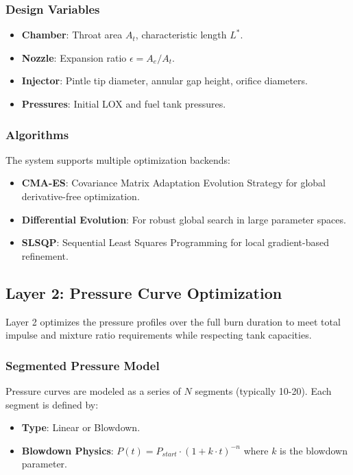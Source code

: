 \subsubsection{Design Variables}
\begin{itemize}
    \item \textbf{Chamber}: Throat area $A_t$, characteristic length $L^*$.
    \item \textbf{Nozzle}: Expansion ratio $\epsilon = A_e/A_t$.
    \item \textbf{Injector}: Pintle tip diameter, annular gap height, orifice diameters.
    \item \textbf{Pressures}: Initial LOX and fuel tank pressures.
\end{itemize}

\subsubsection{Algorithms}
The system supports multiple optimization backends:
\begin{itemize}
    \item \textbf{CMA-ES}: Covariance Matrix Adaptation Evolution Strategy for global derivative-free optimization.
    \item \textbf{Differential Evolution}: For robust global search in large parameter spaces.
    \item \textbf{SLSQP}: Sequential Least Squares Programming for local gradient-based refinement.
\end{itemize}

\subsection{Layer 2: Pressure Curve Optimization}
Layer 2 optimizes the pressure profiles over the full burn duration to meet total impulse and mixture ratio requirements while respecting tank capacities.

\subsubsection{Segmented Pressure Model}
Pressure curves are modeled as a series of $N$ segments (typically 10-20). Each segment is defined by:
\begin{itemize}
    \item \textbf{Type}: Linear or Blowdown.
    \item \textbf{Blowdown Physics}: $P(t) = P_{start} \cdot (1 + k \cdot t)^{-n}$ where $k$ is the blowdown parameter.
\end{itemize}

